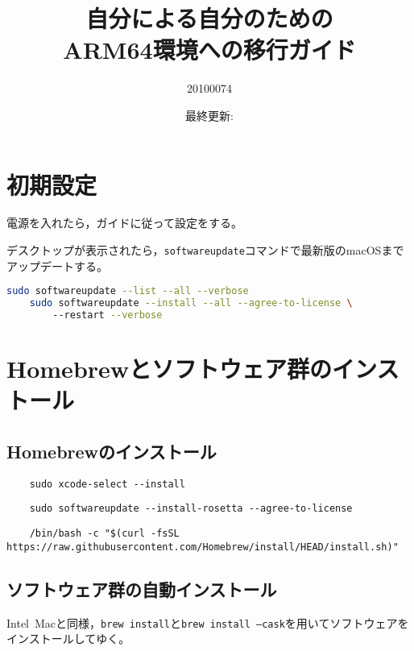 \documentclass[b5j,titlepage]{ltjsarticle}
\title{自分による自分のための \\ ARM64環境への移行ガイド}
\author{20100074}
\date{最終更新: \DTMnow}
\begin{document}
	\maketitle

	\tableofcontents

	\clearpage

	\section{初期設定}
		電源を入れたら，ガイドに従って設定をする。

		デスクトップが表示されたら，\texttt{softwareupdate}コマンドで最新版のmacOSまでアップデートする。

		\begin{lstlisting}[language=bash]
	sudo softwareupdate --list --all --verbose
	sudo softwareupdate --install --all --agree-to-license \ 
		--restart --verbose
		\end{lstlisting}

	\clearpage

	\section{Homebrewとソフトウェア群のインストール}
		\subsection{Homebrewのインストール}
			\begin{lstlisting}
	sudo xcode-select --install
			\end{lstlisting}
			\begin{lstlisting}
	sudo softwareupdate --install-rosetta --agree-to-license
			\end{lstlisting}
			\begin{lstlisting}
	/bin/bash -c "$(curl -fsSL https://raw.githubusercontent.com/Homebrew/install/HEAD/install.sh)"
			\end{lstlisting}
		
		\subsection{ソフトウェア群の自動インストール}
			Intel\ Macと同様，\texttt{brew\ install}と\texttt{brew\ install\ --cask}を用いてソフトウェアをインストールしてゆく。
\end{document}
